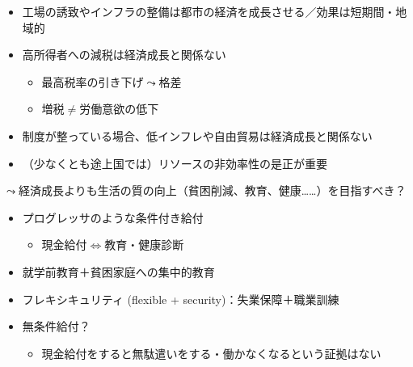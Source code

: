 \documentclass[
  xelatex,
  ja=standard]{bxjsarticle}
\providecommand{\tightlist}{%
  \setlength{\itemsep}{0pt}\setlength{\parskip}{0pt}}\usepackage{longtable,booktabs,array}
\begin{document}
\begin{itemize}
\tightlist
\item
  工場の誘致やインフラの整備は都市の経済を成長させる／効果は短期間・地域的\citep{greenstone2010, kline2014}
\item
  高所得者への減税は経済成長と関係ない\citep{piketty2014}

  \begin{itemize}
  \tightlist
  \item
    最高税率の引き下げ\(\leadsto\)格差
  \item
    増税\(\neq\)労働意欲の低下\citep{saez2012}
  \end{itemize}
\item
  制度が整っている場合、低インフレや自由貿易は経済成長と関係ない\citep{rodrik2004}
\item
  （少なくとも途上国では）リソースの非効率性の是正が重要
\end{itemize}

\(\leadsto\)経済成長よりも生活の質の向上（貧困削減、教育、健康\ldots\ldots）を目指すべき？

\begin{itemize}
\tightlist
\item
  プログレッサのような条件付き給付\citep{fiszbein2009}

  \begin{itemize}
  \tightlist
  \item
    現金給付\(\Leftrightarrow\)教育・健康診断
  \end{itemize}
\item
  就学前教育＋貧困家庭への集中的教育\citep{fryer2017}
\item
  フレキシキュリティ (flexible + security)：失業保障＋職業訓練
\item
  無条件給付？

  \begin{itemize}
  \tightlist
  \item
    現金給付をすると無駄遣いをする・働かなくなるという証拠はない
  \end{itemize}
\end{itemize}


  
\end{document}
